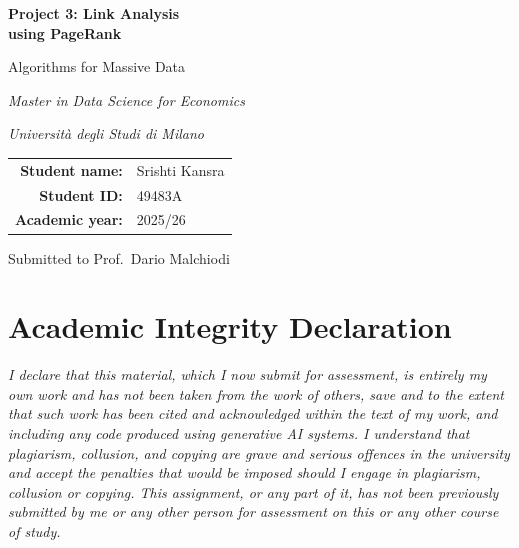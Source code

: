 \documentclass[12pt, a4paper]{article}
\begin{document}
\begin{titlepage}
  \centering
  \vspace*{3cm}
  {\Huge\bfseries\color{uniblue} Project 3: Link Analysis\\[0.4em] using PageRank\par}
  \vspace{1.2em}
  {\large\color{darkblue} Algorithms for Massive Data\par}
  \vspace{0.5em}
  {\normalsize\itshape Master in Data Science for Economics\par}
  {\normalsize\itshape Università degli Studi di Milano\par}
  \vspace{3cm}
  \begin{tabular}{rl}
    \textbf{Student name:} & {Srishti Kansra} \\[0.4em]
    \textbf{Student ID:}   & {49483A} \\[0.4em]
    \textbf{Academic year:} & 2025/26 \\
  \end{tabular}
  \vfill
  {\small\color{gray} Submitted to Prof.\ Dario Malchiodi\par}
\end{titlepage}

\thispagestyle{empty}
\section*{Academic Integrity Declaration}
\begin{declarationbox}
\itshape
I declare that this material, which I now submit for assessment, is entirely my own work and has not been taken from the work of others, save and to the extent that such work has been cited and acknowledged within the text of my work, and including any code produced using generative AI systems. I understand that plagiarism, collusion, and copying are grave and serious offences in the university and accept the penalties that would be imposed should I engage in plagiarism, collusion or copying. This assignment, or any part of it, has not been previously submitted by me or any other person for assessment on this or any other course of study.
\end{declarationbox}
\newpage

\tableofcontents
\newpage
\end{document}
